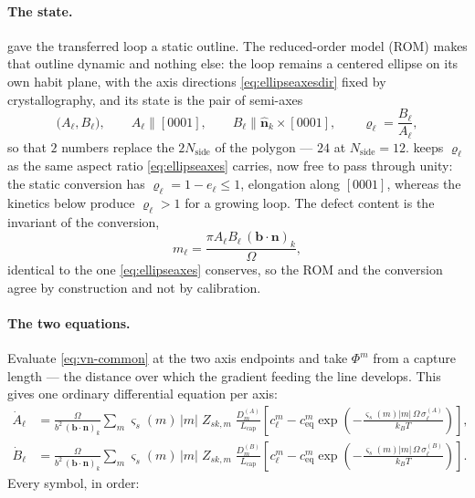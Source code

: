 \documentclass{article}
\newcommand{\bvec}{\bm b}
\newcommand{\nvec}{\bm n}
\begin{document}
\paragraph{The state.}  gave the transferred loop a static
outline. The reduced-order model (ROM) makes that outline dynamic and nothing
else: the loop remains a centered ellipse on its own habit plane, with the axis
directions \cref{eq:ellipseaxesdir} fixed by crystallography, and its state is
the pair of semi-axes
\begin{equation}
  \bigl(A_\ell,B_\ell\bigr),\qquad
  A_\ell \parallel [0001],\qquad
  B_\ell \parallel \hat{\bm n}_k\times[0001],
  \qquad
  \varrho_\ell=\frac{B_\ell}{A_\ell},
  \label{eq:romstate}
\end{equation}
so that $2$ numbers replace the $2N_{\mathrm{side}}$ of the polygon --- $24$ at
$N_{\mathrm{side}}=12$.  keeps $\varrho_\ell$ as the same
aspect ratio \cref{eq:ellipseaxes} carries, now free to pass through unity: the
static conversion has $\varrho_\ell=1-e_\ell\le1$, elongation along $[0001]$,
whereas the kinetics below produce $\varrho_\ell>1$ for a growing loop. The
defect content is the invariant of the conversion,
\begin{equation}
  m_\ell=\frac{\pi A_\ell B_\ell\,(\bvec\!\cdot\!\nvec)_k}{\Omega},
  \label{eq:romcontent}
\end{equation}
identical to the one \cref{eq:ellipseaxes} conserves, so the ROM and the
conversion agree by construction and not by calibration.

\paragraph{The two equations.} Evaluate \cref{eq:vn-common} at the two axis
endpoints and take $\Phi^m$ from a capture length --- the distance over which the
gradient feeding the line develops. This gives one ordinary differential equation
per axis:
\begin{align}
  \dot A_\ell&=\frac{\Omega}{b^{2}\,(\bvec\!\cdot\!\nvec)_k}
    \sum_{m}\varsigma_s(m)\,|m|\;Z_{sk,m}\;\frac{D^{(A)}_m}{L_{\mathrm{cap}}}
    \left[c^m_\ell-c^{m}_{\mathrm{eq}}
      \exp\!\left(-\frac{\varsigma_s(m)|m|\,\Omega\,\sigma^{(A)}_\ell}{k_BT}\right)\right],
  \label{eq:romA}\\[4pt]
  \dot B_\ell&=\frac{\Omega}{b^{2}\,(\bvec\!\cdot\!\nvec)_k}
    \sum_{m}\varsigma_s(m)\,|m|\;Z_{sk,m}\;\frac{D^{(B)}_m}{L_{\mathrm{cap}}}
    \left[c^m_\ell-c^{m}_{\mathrm{eq}}
      \exp\!\left(-\frac{\varsigma_s(m)|m|\,\Omega\,\sigma^{(B)}_\ell}{k_BT}\right)\right].
  \label{eq:romB}
\end{align}
Every symbol, in order:
\end{document}
